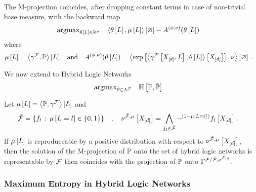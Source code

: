 The M-projection coincides, after dropping constant terms in case of non-trivial base measure, with the backward map
\begin{align*}
	\mathrm{argmax}_{\theta\left[L\right]\in\mathbb{R}^{p}} \quad 
	\left\langle \theta\left[L\right],\mu\left[L\right]\right\rangle \left[ \varnothing \right] - A^{(\phi,\nu)}(\theta\left[L\right]) 
\end{align*}
where
\begin{align*}
	\mu\left[L\right] 
	= \left\langle \gamma^{\mathcal{F}},\mathbb{P}\right\rangle \left[ L \right] 
	\quad \text{and} \quad
	A^{(\phi,\nu)}(\theta\left[L\right]) 
	= \left\langle \mathrm{exp}\left[ \left\langle \gamma^{\mathcal{F}}\left[X_{[d]},L\right],\theta\left[L\right]\right\rangle \left[ X_{[d]} \right] \right], \nu\right\rangle \left[ \varnothing \right] \, . 
\end{align*}

We now extend to Hybrid Logic Networks
\begin{align*}
	\mathrm{argmax}_{\tilde{\mathbb{P}}\in\Lambda^{\mathcal{F}}} \quad 
	\mathbb{H}\left[\mathbb{P},\tilde{\mathbb{P}}\right]	
\end{align*}



\begin{corollary}
	Let $\mu\left[L\right] = \left\langle \mathbb{P},\gamma^{\mathcal{F}}\right\rangle \left[ L \right]$ and
		\[ \tilde{\mathcal{F}} = \{f_{l} \, : \, \mu\left[L_{}=l_{}\right] \in \{0,1\}\} \quad , \quad 
		\nu^{\tilde{\mathcal{F}},\mu}\left[X_{[d]}\right] 
		= \bigwedge_{f_{l}\in\tilde{\mathcal{F}}} \lnot^{(1-\mu\left[L_{}=l_{}\right])} f_{l}\left[X_{[d]}\right]
		\, . \]
	If $\mu\left[L\right]$ is reproduceable by a positive distribution with respect to $\nu^{\tilde{\mathcal{F}},\mu}\left[X_{[d]}\right] $, then the solution of the M-projection of $\mathbb{P}$ onto the set of hybrid logic networks is representable by $\mathcal{F}$ then coincides with the projection of $\mathbb{P}$ onto $\Gamma^{\mathcal{F}/\tilde{\mathcal{F}},\nu^{\tilde{\mathcal{F}},\mu}}$.
\end{corollary}

\subsubsection{Maximum Entropy in Hybrid Logic Networks}


